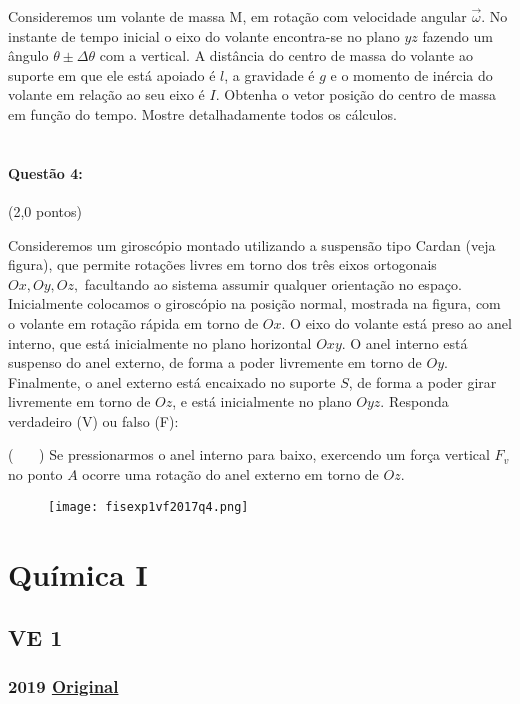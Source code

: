 \documentclass[12pt,a4paper]{article}
\newcommand{\original}[1]{\tiny \href{#1}{Original} \normalsize}
\begin{document}
Consideremos um volante de massa M, em rotação com velocidade angular $\overrightarrow{\omega}$. No instante de tempo inicial o eixo do volante encontra-se no plano $yz$ fazendo um ângulo $\theta \pm \Delta\theta$ com a vertical. A distância do centro de massa do
volante ao suporte em que ele está apoiado é $l$, a gravidade é $g$ e o momento de inércia do volante
em relação ao seu eixo é $I$. Obtenha o vetor posição do centro de massa em função do tempo. Mostre detalhadamente todos os cálculos.
\\\\
\paragraph{Questão 4:} (2,0 pontos)

Consideremos um giroscópio montado utilizando a suspensão tipo Cardan (veja figura), que permite rotações livres em torno dos três eixos ortogonais $Ox,Oy, Oz,$ facultando ao sistema assumir qualquer orientação no espaço. Inicialmente colocamos o giroscópio na posição normal, mostrada na figura, com o volante em rotação rápida em torno de $Ox$. O eixo do volante está preso ao anel interno, que está inicialmente no plano horizontal $Oxy$. O anel interno está suspenso do anel externo, de forma a poder livremente em torno de $Oy$. Finalmente, o anel externo está encaixado no suporte $S$, de forma a poder girar livremente em torno de $Oz$, e está inicialmente no plano $Oyz$. Responda verdadeiro (V) ou falso (F):

\newpage

( \ \ \  ) Se pressionarmos o anel interno para baixo, exercendo um força vertical $F_v$ no ponto $A$
ocorre uma rotação do anel externo em torno de $Oz$.

\begin{figure}[h]
\centering
\texttt{[image: fisexp1vf2017q4.png]}
\end{figure}


\newpage
\section{Química I}

\subsection{VE 1}

\subsubsection{2019 \original{https://drive.google.com/open?id=1TrwYScvgXoinEYdlh0igZyHAyiWV9k_E}}
\end{document}
